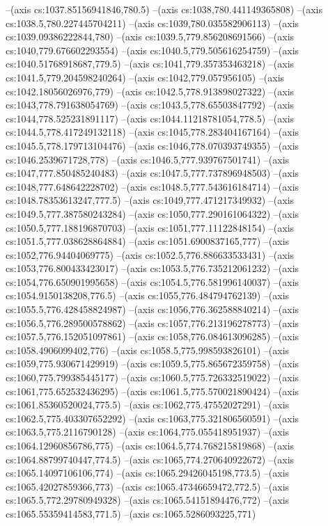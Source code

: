 --(axis cs:1037.85156941846,780.5)
--(axis cs:1038,780.441149365808)
--(axis cs:1038.5,780.227445704211)
--(axis cs:1039,780.035582906113)
--(axis cs:1039.09386222844,780)
--(axis cs:1039.5,779.856208691566)
--(axis cs:1040,779.676602293554)
--(axis cs:1040.5,779.505616254759)
--(axis cs:1040.51768918687,779.5)
--(axis cs:1041,779.357353463218)
--(axis cs:1041.5,779.204598240264)
--(axis cs:1042,779.057956105)
--(axis cs:1042.18056026976,779)
--(axis cs:1042.5,778.913898027322)
--(axis cs:1043,778.791638054769)
--(axis cs:1043.5,778.65503847792)
--(axis cs:1044,778.525231891117)
--(axis cs:1044.11218781054,778.5)
--(axis cs:1044.5,778.417249132118)
--(axis cs:1045,778.283404167164)
--(axis cs:1045.5,778.179713104476)
--(axis cs:1046,778.070393749355)
--(axis cs:1046.2539671728,778)
--(axis cs:1046.5,777.939767501741)
--(axis cs:1047,777.850485240483)
--(axis cs:1047.5,777.737896948503)
--(axis cs:1048,777.648642228702)
--(axis cs:1048.5,777.543616184714)
--(axis cs:1048.78353613247,777.5)
--(axis cs:1049,777.471217349932)
--(axis cs:1049.5,777.387580243284)
--(axis cs:1050,777.290161064322)
--(axis cs:1050.5,777.188196870703)
--(axis cs:1051,777.11122848154)
--(axis cs:1051.5,777.038628864884)
--(axis cs:1051.6900837165,777)
--(axis cs:1052,776.94404069775)
--(axis cs:1052.5,776.886633533431)
--(axis cs:1053,776.800433423017)
--(axis cs:1053.5,776.735212061232)
--(axis cs:1054,776.650901995658)
--(axis cs:1054.5,776.581996140037)
--(axis cs:1054.9150138208,776.5)
--(axis cs:1055,776.484794762139)
--(axis cs:1055.5,776.428458824987)
--(axis cs:1056,776.362588840214)
--(axis cs:1056.5,776.289500578862)
--(axis cs:1057,776.213196278773)
--(axis cs:1057.5,776.152051097861)
--(axis cs:1058,776.084613096285)
--(axis cs:1058.4906099402,776)
--(axis cs:1058.5,775.998593826101)
--(axis cs:1059,775.930671429919)
--(axis cs:1059.5,775.865672359758)
--(axis cs:1060,775.799385445177)
--(axis cs:1060.5,775.726332519022)
--(axis cs:1061,775.652532436295)
--(axis cs:1061.5,775.570021890424)
--(axis cs:1061.85360520024,775.5)
--(axis cs:1062,775.47552027291)
--(axis cs:1062.5,775.403307652292)
--(axis cs:1063,775.321806560591)
--(axis cs:1063.5,775.2116790128)
--(axis cs:1064,775.055418951937)
--(axis cs:1064.12960856786,775)
--(axis cs:1064.5,774.768215819868)
--(axis cs:1064.88799740447,774.5)
--(axis cs:1065,774.270640922672)
--(axis cs:1065.14097106106,774)
--(axis cs:1065.29426045198,773.5)
--(axis cs:1065.42027859366,773)
--(axis cs:1065.47346659472,772.5)
--(axis cs:1065.5,772.29780949328)
--(axis cs:1065.54151894476,772)
--(axis cs:1065.55359414583,771.5)
--(axis cs:1065.5286093225,771)
